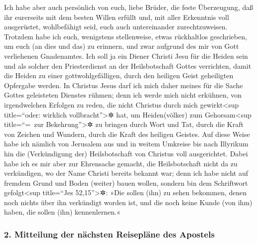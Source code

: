  Ich habe aber auch persönlich von euch, liebe Brüder,
die feste Überzeugung, daß ihr eurerseits mit dem besten Willen erfüllt
und, mit aller Erkenntnis voll ausgerüstet, wohlbefähigt seid, euch auch
untereinander zurechtzuweisen.  Trotzdem habe ich euch,
wenigstens stellenweise, etwas rückhaltlos geschrieben, um euch (an dies
und das) zu erinnern, und zwar aufgrund des mir von Gott verliehenen
Gnadenamtes.  Ich soll ja ein Diener Christi Jesu für die
Heiden sein und als solcher den Priesterdienst an der Heilsbotschaft
Gottes verrichten, damit die Heiden zu einer gottwohlgefälligen, durch
den heiligen Geist geheiligten Opfergabe werden.  In
Christus Jesus darf ich mich daher meines für die Sache Gottes
geleisteten Dienstes rühmen;  denn ich werde mich nicht
erkühnen, von irgendwelchen Erfolgen zu reden, die nicht Christus durch
mich gewirkt\textless sup title=``oder: wirklich
vollbracht''\textgreater✲ hat, um Heiden(völker) zum
Gehorsam\textless sup title=``=~zur Bekehrung''\textgreater✲ zu bringen
durch Wort und Tat,  durch die Kraft von Zeichen und
Wundern, durch die Kraft des heiligen Geistes. Auf diese Weise habe ich
nämlich von Jerusalem aus und in weitem Umkreise bis nach Illyrikum hin
die (Verkündigung der) Heilsbotschaft von Christus voll ausgerichtet.
 Dabei habe ich es mir aber zur Ehrensache gemacht, die
Heilsbotschaft nicht da zu verkündigen, wo der Name Christi bereits
bekannt war; denn ich habe nicht auf fremdem Grund und Boden (weiter)
bauen wollen,  sondern bin dem Schriftwort
gefolgt\textless sup title=``Jes 52,15''\textgreater✲: »Die sollen (ihn)
zu sehen bekommen, denen noch nichts über ihn verkündigt worden ist, und
die noch keine Kunde (von ihm) haben, die sollen (ihn) kennenlernen.«

\hypertarget{mitteilung-der-nuxe4chsten-reisepluxe4ne-des-apostels}{%
\subsubsection{2. Mitteilung der nächsten Reisepläne des
Apostels}\label{mitteilung-der-nuxe4chsten-reisepluxe4ne-des-apostels}}

